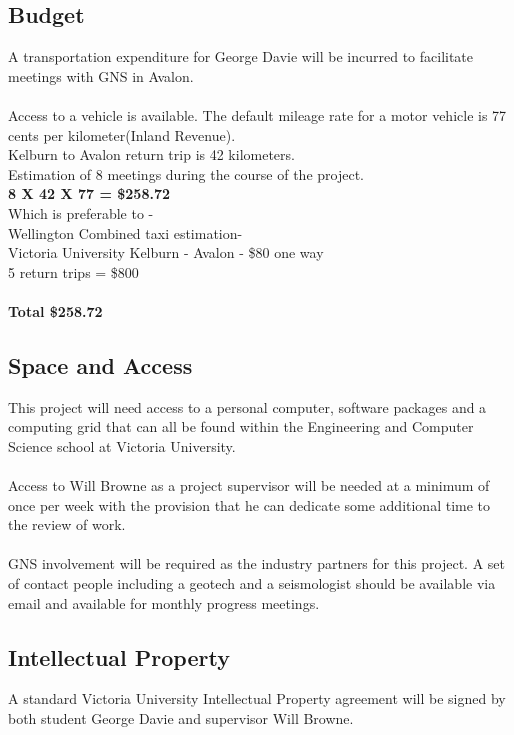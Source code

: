 \documentclass[11pt, a4paper, twoside, openright]{report}
\begin{document}
\subsection*{Budget}
A transportation expenditure for George Davie will be incurred to facilitate
meetings with GNS in Avalon.
\\
\\
Access to a vehicle is available. The default mileage rate for a motor vehicle is 77 cents per kilometer(Inland Revenue)\cite{ird1}. 
\\Kelburn to Avalon return trip is 42 kilometers.
\\Estimation of 8 meetings during the course of the project.
\\{\bf 8 X 42 X 77 = \$258.72}
\\Which is preferable to -
\\Wellington Combined taxi estimation- 
\\Victoria University Kelburn - Avalon - \$80 one way 
\\5 return trips = \$800
\\
\\
{\bf Total \$258.72}
\subsection*{Space and Access}

This project will need access to a personal computer, software packages and a
computing grid that can all be found within the Engineering and Computer Science
school at Victoria University.
\\
\\
Access to Will Browne as a project supervisor will be needed at a minimum of once
per week with the provision that he can dedicate some additional time to the
review of work.
\\
\\
GNS involvement will be required as the industry partners for this project. A
set of contact people including a geotech and a seismologist should be available
via email and available for monthly progress meetings. 

\subsection*{Intellectual Property}
A standard Victoria University Intellectual Property agreement will be signed by both student George Davie and supervisor Will Browne. 
\backmatter


%

\end{document}
